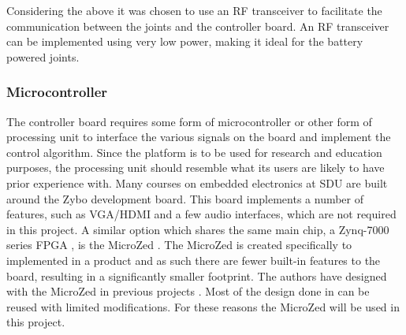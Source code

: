 Considering the above it was chosen to use an RF transceiver to facilitate the communication between the joints and the controller board.
An RF transceiver can be implemented using very low power, making it ideal for the battery powered joints.

\subsubsection{Microcontroller} %
\label{ssub:microcontroller}
The controller board requires some form of microcontroller or other form of processing unit to interface the various signals on the board and implement the control algorithm.
Since the platform is to be used for research and education purposes, the processing unit should resemble what its users are likely to have prior experience with.
Many courses on embedded electronics at SDU are built around the Zybo development board\cite{zybo}.
This board implements a number of features, such as VGA/HDMI and a few audio interfaces, which are not required in this project.
A similar option which shares the same main chip, a Zynq-7000 series FPGA \cite{zynq}, is the MicroZed \cite{microzed}.
The MicroZed is created specifically to implemented in a product and as such there are fewer built-in features to the board, resulting in a significantly smaller footprint.
The authors have designed with the MicroZed in previous projects \cite{isaswarm}.
Most of the design done in \cite{isaswarm} can be reused with limited modifications.
For these reasons the MicroZed will be used in this project.

